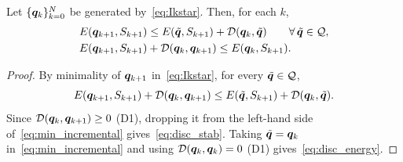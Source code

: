 \begin{proposition}
\label{prop:discrete_energy}
Let $\{\bm{q}_k\}_{k=0}^N$ be generated by~\eqref{eq:Ikstar}. Then, for
each $k$,
\begin{align}
  &E(\bm{q}_{k+1},S_{k+1})\le E(\tilde{\bm{q}},S_{k+1})+\mathcal{D}(\bm{q}_k,\tilde{\bm{q}})
  \qquad\forall\,\tilde{\bm{q}}\in\mathcal{Q}, \label{eq:disc_stab}\\
  &E(\bm{q}_{k+1},S_{k+1})+\mathcal{D}(\bm{q}_k,\bm{q}_{k+1})\le E(\bm{q}_k,S_{k+1}). \label{eq:disc_energy}
\end{align}
\end{proposition}

\begin{proof}
By minimality of $\bm{q}_{k+1}$ in~\eqref{eq:Ikstar}, for every
$\tilde{\bm{q}}\in\mathcal{Q}$,
\begin{equation}\label{eq:min_incremental}
  E(\bm{q}_{k+1},S_{k+1})+\mathcal{D}(\bm{q}_k,\bm{q}_{k+1})
  \le E(\tilde{\bm{q}},S_{k+1})+\mathcal{D}(\bm{q}_k,\tilde{\bm{q}}).
\end{equation}
Since $\mathcal{D}(\bm{q}_k,\bm{q}_{k+1})\ge0$ (D1), dropping it from the
left-hand side of~\eqref{eq:min_incremental} gives~\eqref{eq:disc_stab}.
Taking $\tilde{\bm{q}}=\bm{q}_k$ in~\eqref{eq:min_incremental} and using
$\mathcal{D}(\bm{q}_k,\bm{q}_k)=0$ (D1) gives~\eqref{eq:disc_energy}.
\end{proof}

